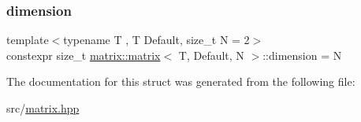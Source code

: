 \mbox{\label{structmatrix_1_1matrix_a7d76bd51fd998974f59ea4035e053f74}} 
\subsubsection{\texorpdfstring{dimension}{dimension}}
{\footnotesize\ttfamily template$<$typename T , T Default, size\+\_\+t N = 2$>$ \\
constexpr size\+\_\+t \hyperlink{structmatrix_1_1matrix}{matrix\+::matrix}$<$ T, Default, N $>$\+::dimension = N\hspace{0.3cm}{\ttfamily [static]}}



The documentation for this struct was generated from the following file\+:\begin{DoxyCompactItemize}
\item 
src/\hyperlink{matrix_8hpp}{matrix.\+hpp}\end{DoxyCompactItemize}
